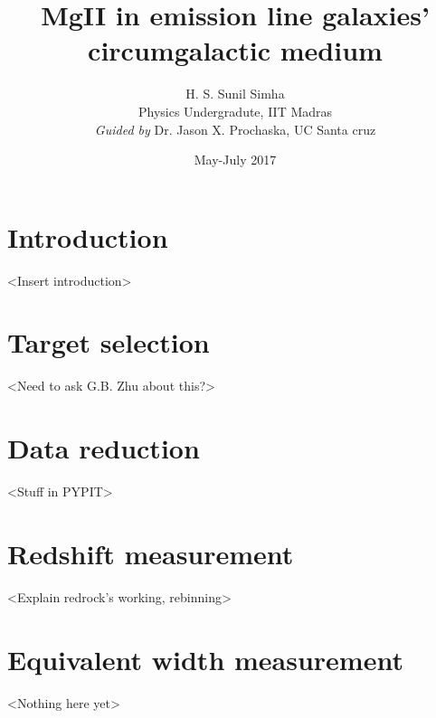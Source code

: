 \documentclass[a4paper,10pt,twocolumn,twoside]{article}
\begin{document}
\title{MgII in emission line galaxies' circumgalactic medium}
\author{H. S. Sunil Simha \\Physics Undergradute, IIT Madras\\ \emph{Guided by }Dr. Jason X. Prochaska, UC Santa cruz}
\date{May-July 2017}
\section{Introduction}
	<Insert introduction>
\section{Target selection}
  <Need to ask G.B. Zhu about this?>
\section{Data reduction}
  <Stuff in PYPIT>
\section{Redshift measurement}
  <Explain redrock's working, rebinning>
\section{Equivalent width measurement}
  <Nothing here yet>
\end{document}
